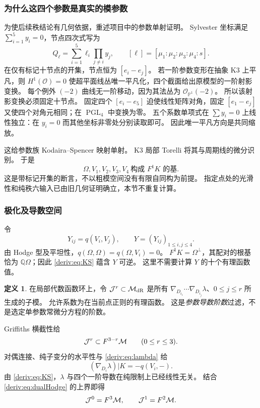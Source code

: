 \documentclass[11pt,a4paper,oneside]{ctexart}
\theoremstyle{cnplain}
\theoremstyle{definition}
\newtheorem{definition}[theorem]{定义}
\theoremstyle{remark}
\newcommand{\Q}{\mathbb Q}
\newcommand{\dR}{\mathrm{dR}}
\numberwithin{equation}{section}
\begin{document}
\subsubsection{为什么这四个参数是真实的模参数}
为使后续秩结论有几何依据，重述项目中的参数单射证明。
Sylvester 坐标满足 $\sum_{i=1}^5y_i=0$，节点四次式写为
\begin{equation}\label{deriv:eq:Sylvester}
 Q_\ell=\sum_{i=1}^5\ell_i\prod_{j\ne i}y_j,
 \qquad [\ell]=[\mu_1:\mu_2:\mu_3:\mu_4:s].
\end{equation}
在仅有标记十节点的开集，节点恒为 $[e_i-e_j]$。
若一阶参数变形在抽象 K3 上平凡，则 $H^1(\mathcal O)=0$ 使超平面线丛唯一平凡化，四个截面给出原模型的一阶射影变换。
每个例外 $(-2)$ 曲线无一阶移动，因为其法丛为 $\mathcal O_{\mathbb P^1}(-2)$。
所以该射影变换必须固定十节点。
固定四个 $[e_i-e_5]$ 迫使线性矩阵对角，固定 $[e_1-e_j]$ 又使四个对角元相同；在 $\operatorname{PGL}_4$ 中变换为零。
五个系数单项式在 $\sum y_i=0$ 上线性独立：在 $y_i=0$ 而其他坐标非零处分别读取即可。
因此唯一平凡方向是共同缩放。

这给参数族 Kodaira--Spencer 映射单射。
K3 局部 Torelli 将其与周期线的微分识别\cite[Chapter 6, Proposition 2.8]{huybrechts}。
于是
\begin{equation}\label{deriv:eq:KS}
 \Omega,V_1,V_2,V_3,V_4\ \text{构成 }F^1K\text{ 的基}.
\end{equation}
这是带标记开集的断言，不以粗模空间没有有限自同构为前提。
指定点处的光滑性和纯秩六输入已由旧几何证明确立，本节不重复计算。

\subsubsection{极化及导数空间}
令
\begin{equation}\label{deriv:eq:Y}
 Y_{ij}=q(V_i,V_j),\qquad Y=(Y_{ij})_{1\le i,j\le4}.
\end{equation}
由 Hodge 型及平坦性，$q(\Omega,\Omega)=q(\Omega,V_i)=0$。
$F^1K=\Omega^\perp$，其配对的根基恰为 $\Q\Omega$；因此 \eqref{deriv:eq:KS} 蕴含 $Y$ 可逆。
这里不需要计算 $Y$ 的十个有理函数值。

\begin{definition}
在局部代数函数环上，令 $\mathcal J^r\subset\cM_{\dR}$ 是所有
$\nabla_{D_{i_1}}\cdots\nabla_{D_{i_j}}\lambda$、$0\le j\le r$ 所生成的子模。
允许系数为在当前点正则的有理函数。
这是\emph{参数导数阶数}过滤，不是选定单参数常微分方程的阶数。
\end{definition}

Griffiths 横截性给
\begin{equation}\label{deriv:eq:upper}
 \mathcal J^r\subset F^{3-r}\mathcal M\qquad(0\le r\le3).
\end{equation}
对偶连接、纯子变分的水平性与 \eqref{deriv:eq:lambda} 给
\begin{equation}\label{deriv:eq:first}
 (\nabla_{D_i}\lambda)|K=-q(V_i,-).
\end{equation}
由 \eqref{deriv:eq:KS}，$\lambda$ 与四个一阶导数在纯限制上已经线性无关。
结合 \eqref{deriv:eq:dualHodge} 的上界即得
\begin{equation}\label{deriv:eq:jet1}
 \mathcal J^0=F^3\mathcal M,\qquad\mathcal J^1=F^2\mathcal M.
\end{equation}
\end{document}
